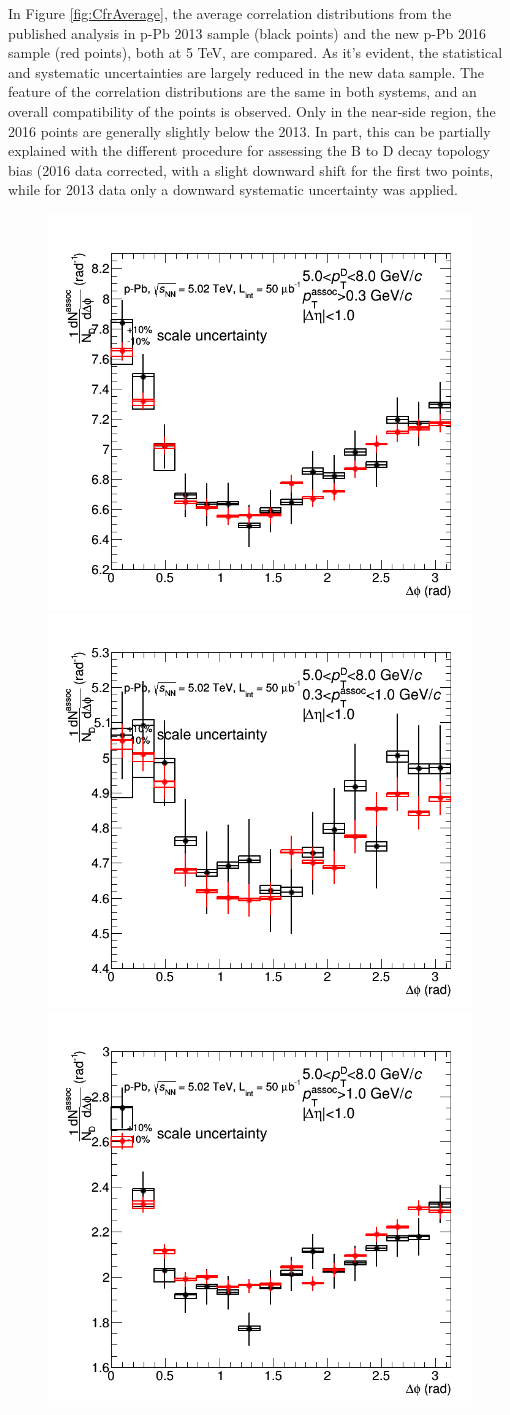 In Figure \ref{fig:CfrAverage}, the average correlation distributions from the published analysis in p-Pb 2013 sample (black points) and the new p-Pb 2016 sample (red points), both at 5 TeV, are compared. As it's evident, the statistical and systematic uncertainties are largely reduced in the new data sample. The feature of the correlation distributions are the same in both systems, and an overall compatibility of the points is observed. Only in the near-side region, the 2016 points are generally slightly below the 2013. In part, this can be partially explained with the different procedure for assessing the B to D decay topology bias (2016 data corrected, with a slight downward shift for the first two points, while for 2013 data only a downward systematic uncertainty was applied.

\begin{figure}[!htbp]
\centering
\centering
{\includegraphics[width=0.47\linewidth]{figures/Cfr2013vs2016/Average_Cfr_2013_2016_Pt5to8_Thr03to99.png}}
{\includegraphics[width=0.47\linewidth]{figures/Cfr2013vs2016/Average_Cfr_2013_2016_Pt5to8_Thr03to1.png}}
{\includegraphics[width=0.47\linewidth]{figures/Cfr2013vs2016/Average_Cfr_2013_2016_Pt5to8_Thr1to99.png}}

\end{figure}
